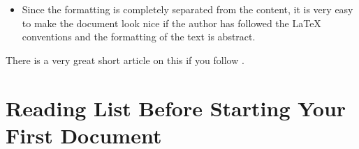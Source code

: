 \documentclass[
    draft
    ]{scrartcl}
\begin{document}
\begin{itemize}
\begin{enumerate}
            \item The built in command \verb|\emph| already takes care of the
                fact that if you want to emphasize some text in already
                emphasized text, it will still get emphasized.
                
                For example:
                
                \emph{This is \emph{very} important text}.
                
                can be achieved by:
\begin{lstlisting}
\emph{This is \emph{very} important text}.
\end{lstlisting}
        \end{enumerate}
    \item Since the formatting is completely separated from the content, it is
        very easy to make the document look nice if the author has followed the
        \LaTeX{} conventions and the formatting of the text is abstract.

\end{itemize}

There is a very great short article on this if you follow
    .

\section{Reading List Before Starting Your First Document}
\end{document}

